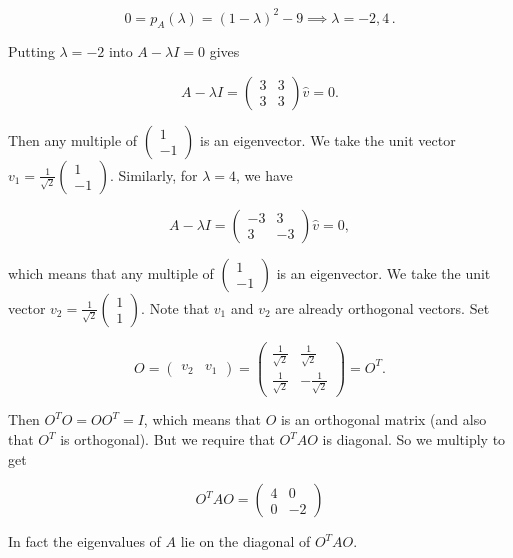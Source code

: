 \documentclass[11pt]{article}
\begin{document}
$$ 0 = p_A(\lambda) = (1-\lambda)^2 - 9 \implies \lambda = -2,4\,.$$

Putting $\lambda = -2$ into $A-\lambda I = 0$ gives

$$A-\lambda I = \begin{pmatrix}
3& 3 \\ 3 & 3
\end{pmatrix}\hat{v} = 0.$$

Then any multiple of $\begin{pmatrix}
1 \\ -1
\end{pmatrix}$ is an eigenvector. We take the unit vector $v_1 = \frac{1}{\sqrt{2}} \begin{pmatrix}
1 \\ -1
\end{pmatrix}$. Similarly, for $\lambda = 4$, we have

$$A-\lambda I = \begin{pmatrix}
-3& 3 \\ 3 & -3
\end{pmatrix}\hat{v} = 0,$$

which means that any multiple of $\begin{pmatrix}
1 \\ -1
\end{pmatrix}$ is an eigenvector. We take the unit vector $v_2 = \frac{1}{\sqrt{2}} \begin{pmatrix}
1 \\ 1
\end{pmatrix}$. Note that $v_1$ and $v_2$ are already orthogonal vectors. Set

$$O = \begin{pmatrix}
v_2 & v_1
\end{pmatrix}= \begin{pmatrix}
\frac{1}{\sqrt{2}} & \frac{1}{\sqrt{2}} \\ \frac{1}{\sqrt{2}} & -\frac{1}{\sqrt{2}}
\end{pmatrix} = O^T.$$

Then $O^TO = OO^T = I$, which means that $O$ is an orthogonal matrix (and also that $O^T$ is orthogonal). But we require that $O^TAO$ is diagonal. So we multiply to get

$$O^TAO = \begin{pmatrix}
4 & 0 \\ 0 & -2
\end{pmatrix}
$$

In fact the eigenvalues of $A$ lie on the diagonal of $O^TAO$. 
\end{document}
